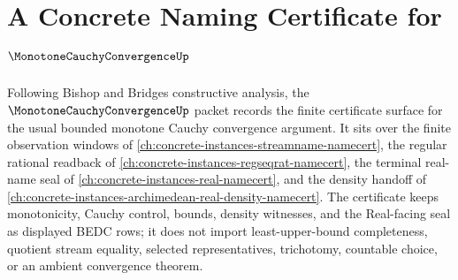 \chapter{A Concrete Naming Certificate for $\MonotoneCauchyConvergenceUp$}
\label{ch:concrete-instances-monotone-cauchy-convergence-namecert}

Following Bishop and Bridges constructive analysis, the $\MonotoneCauchyConvergenceUp$ packet records the finite certificate surface for the usual bounded monotone Cauchy convergence argument. It sits over the finite observation windows of \autoref{ch:concrete-instances-streamname-namecert}, the regular rational readback of \autoref{ch:concrete-instances-regseqrat-namecert}, the terminal real-name seal of \autoref{ch:concrete-instances-real-namecert}, and the density handoff of \autoref{ch:concrete-instances-archimedean-real-density-namecert}. The certificate keeps monotonicity, Cauchy control, bounds, density witnesses, and the Real-facing seal as displayed BEDC rows; it does not import least-upper-bound completeness, quotient stream equality, selected representatives, trichotomy, countable choice, or an ambient convergence theorem.


